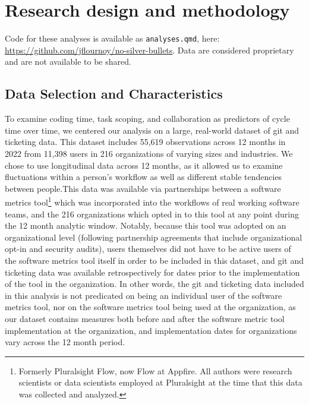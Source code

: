 \documentclass[
]{article}
\begin{document}
\section{Research design and
methodology}\label{research-design-and-methodology}

Code for these analyses is available as \texttt{analyses.qmd}, here:
\url{https://github.com/jflournoy/no-silver-bullets}. Data are
considered proprietary and are not available to be shared.

\subsection{Data Selection and
Characteristics}\label{data-selection-and-characteristics}

To examine coding time, task scoping, and collaboration as predictors of
cycle time over time, we centered our analysis on a large, real-world
dataset of git and ticketing data. This dataset includes 55,619
observations across 12 months in 2022 from 11,398 users in 216
organizations of varying sizes and industries. We chose to use
longitudinal data across 12 months, as it allowed us to examine
fluctuations within a person's workflow as well as different stable
tendencies between people.This data was available via partnerships
between a software metrics tool\footnote{Formerly Pluralsight Flow, now
  Flow at Appfire. All authors were research scientists or data
  scientists employed at Pluralsight at the time that this data was
  collected and analyzed.} which was incorporated into the workflows of
real working software teams, and the 216 organizations which opted in to
this tool at any point during the 12 month analytic window. Notably,
because this tool was adopted on an organizational level (following
partnership agreements that include organizational opt-in and security
audits), users themselves did not have to be active users of the
software metrics tool itself in order to be included in this dataset,
and git and ticketing data was available retrospectively for dates prior
to the implementation of the tool in the organization. In other words,
the git and ticketing data included in this analysis is not predicated
on being an individual user of the software metrics tool, nor on the
software metrics tool being used at the organization, as our dataset
contains measures both before and after the software metric tool
implementation at the organization, and implementation dates for
organizations vary across the 12 month period.
\end{document}
